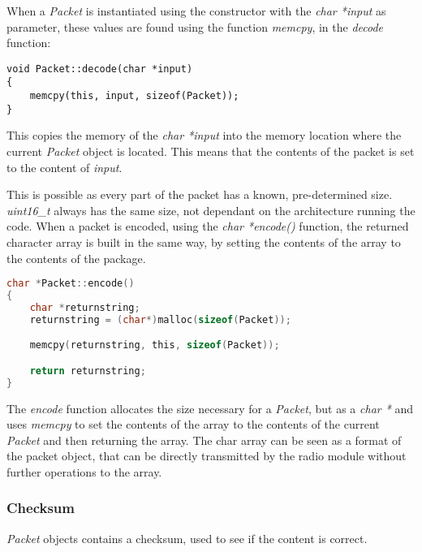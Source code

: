 When a \textit{Packet} is instantiated using the constructor with the \textit{char *input} as parameter, these values are found using the function \textit{memcpy}, in the \textit{decode} function:
\begin{lstlisting}
void Packet::decode(char *input)
{
    memcpy(this, input, sizeof(Packet));
}
\end{lstlisting}
This copies the memory of the \textit{char *input} into the memory location where the current \textit{Packet} object is located. This means that the contents of the packet is set to the content of \textit{input}.

This is possible as every part of the packet has a known, pre-determined size. \textit{uint16\_t} always has the same size, not dependant on the architecture running the code. When a packet is encoded, using the \textit{char *encode()} function, the returned character array is built in the same way, by setting the contents of the array to the contents of the package.

\begin{lstlisting}[language=C]
char *Packet::encode()
{
    char *returnstring;
    returnstring = (char*)malloc(sizeof(Packet));

    memcpy(returnstring, this, sizeof(Packet));

    return returnstring;
}
\end{lstlisting}
The \textit{encode} function allocates the size necessary for a \textit{Packet}, but as a \textit{char *} and uses \textit{memcpy} to set the contents of the array to the contents of the current \textit{Packet} and then returning the array. The char array can be seen as a format of the packet object, that can be directly transmitted by the radio module without further operations to the array.

\subsubsection{Checksum}
\textit{Packet} objects contains a checksum, used to see if the content is correct. 
